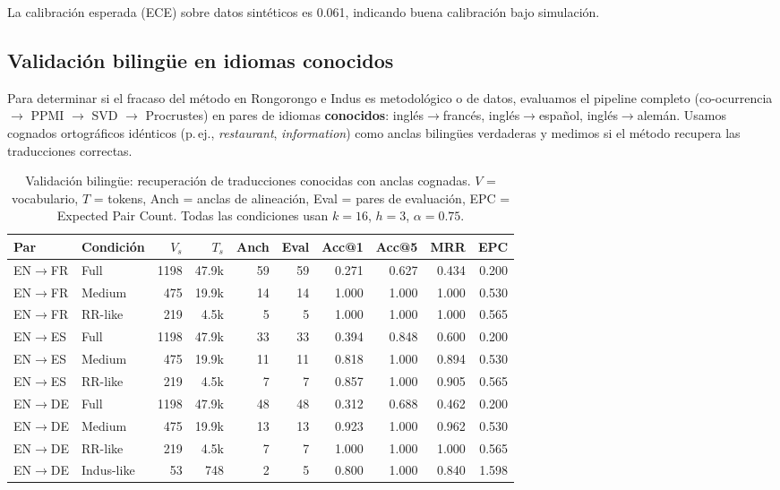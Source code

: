 \documentclass[11pt,a4paper]{article}
\newcommand{\1}{\mathbf{1}}
\numberwithin{equation}{section}
\begin{document}
La calibración esperada (ECE) sobre datos sintéticos es 0.061, indicando buena calibración bajo simulación.

\subsection{Validación bilingüe en idiomas conocidos}

Para determinar si el fracaso del método en Rongorongo e Indus es metodológico o de datos, evaluamos el pipeline completo (co-ocurrencia $\to$ PPMI $\to$ SVD $\to$ Procrustes) en pares de idiomas \textbf{conocidos}: inglés$\to$francés, inglés$\to$español, inglés$\to$alemán. Usamos cognados ortográficos idénticos (p.\,ej., \emph{restaurant}, \emph{information}) como anclas bilingües verdaderas y medimos si el método recupera las traducciones correctas.

\begin{table}[h]
\centering
\caption{Validación bilingüe: recuperación de traducciones conocidas con anclas cognadas. $V$ = vocabulario, $T$ = tokens, Anch = anclas de alineación, Eval = pares de evaluación, EPC = Expected Pair Count. Todas las condiciones usan $k=16$, $h=3$, $\alpha=0.75$.}
\label{tab:bilingual}
\begin{tabular}{llrrrrrrrr}
\toprule
Par & Condición & $V_s$ & $T_s$ & Anch & Eval & Acc@1 & Acc@5 & MRR & EPC \\
\midrule
EN$\to$FR & Full & 1198 & 47.9k & 59 & 59 & 0.271 & 0.627 & 0.434 & 0.200 \\
EN$\to$FR & Medium & 475 & 19.9k & 14 & 14 & 1.000 & 1.000 & 1.000 & 0.530 \\
EN$\to$FR & RR-like & 219 & 4.5k & 5 & 5 & 1.000 & 1.000 & 1.000 & 0.565 \\
\midrule
EN$\to$ES & Full & 1198 & 47.9k & 33 & 33 & 0.394 & 0.848 & 0.600 & 0.200 \\
EN$\to$ES & Medium & 475 & 19.9k & 11 & 11 & 0.818 & 1.000 & 0.894 & 0.530 \\
EN$\to$ES & RR-like & 219 & 4.5k & 7 & 7 & 0.857 & 1.000 & 0.905 & 0.565 \\
\midrule
EN$\to$DE & Full & 1198 & 47.9k & 48 & 48 & 0.312 & 0.688 & 0.462 & 0.200 \\
EN$\to$DE & Medium & 475 & 19.9k & 13 & 13 & 0.923 & 1.000 & 0.962 & 0.530 \\
EN$\to$DE & RR-like & 219 & 4.5k & 7 & 7 & 1.000 & 1.000 & 1.000 & 0.565 \\
EN$\to$DE & Indus-like & 53 & 748 & 2 & 5 & 0.800 & 1.000 & 0.840 & 1.598 \\
\bottomrule
\end{tabular}
\end{table}
\end{document}
